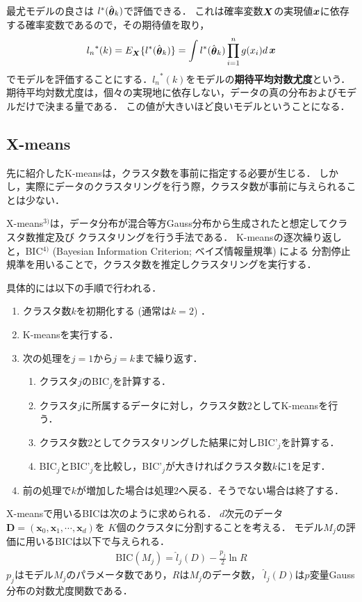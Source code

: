 最尤モデルの良さは $l^*(\hat{\mathop{\bm{\theta}}}_k)$で評価できる．
これは確率変数$\mathop{\bm{X}}$の実現値$\mathop{\bm{x}}$に依存する確率変数であるので，その期待値を取り，
\begin{align*}
  {l_n}^*(k) = E_{\mathop{\bm{X}}}\{l^*(\hat{\mathop{\bm{\theta}}}_k)\} = \int l^*(\hat{\mathop{\bm{\theta}}}_k) \prod^n_{i=1} g(x_i) d\mathop{\bm{x}}
\end{align*}
でモデルを評価することにする．${l_n}^*(k)$をモデルの\textbf{期待平均対数尤度}という．
期待平均対数尤度は，個々の実現地に依存しない，データの真の分布およびモデルだけで決まる量である．
この値が大きいほど良いモデルということになる．



\subsection{X-means}
先に紹介したK-meansは，クラスタ数を事前に指定する必要が生じる．
しかし，実際にデータのクラスタリングを行う際，クラスタ数が事前に与えられることは少ない．

X-means$^{3)}$は，データ分布が混合等方Gauss分布から生成されたと想定してクラスタ数推定及び
クラスタリングを行う手法である．
K-meansの逐次繰り返しと，BIC$^{4)}$ (Bayesian Information Criterion; ベイズ情報量規準) による
分割停止規準を用いることで，クラスタ数を推定しクラスタリングを実行する．

具体的には以下の手順で行われる．
\begin{enumerate}
    \item クラスタ数$k$を初期化する (通常は$k=2$) ．
    \item K-meansを実行する．
    \item 次の処理を$j=1$から$j=k$まで繰り返す．
    \begin{enumerate}
        \item クラスタ$j$のBIC$_j$を計算する．
        \item クラスタ$j$に所属するデータに対し，クラスタ数2としてK-meansを行う．
        \item クラスタ数2としてクラスタリングした結果に対しBIC'$_j$を計算する．
        \item BIC$_j$とBIC'$_j$を比較し，BIC'$_j$が大きければクラスタ数$k$に1を足す．
    \end{enumerate}
    \item 前の処理で$k$が増加した場合は処理2へ戻る．そうでない場合は終了する．
\end{enumerate}

X-meansで用いるBICは次のように求められる．
$d$次元のデータ${\bm D}=({\bm x_0}, {\bm x_1}, \cdots, {\bm x_d})$を
$K$個のクラスタに分割することを考える．
モデル$M_j$の評価に用いるBICは以下で与えられる．
\begin{align}
  \label{eq:bic}
  \mathrm{BIC}(M_j) = \hat{l}_j(D) - \frac{p_j}{2}\ln R
\end{align}
$p_j$はモデル$M_j$のパラメータ数であり，$R$は$M_j$のデータ数，
$\hat{l}_j(D)$は$p$変量Gauss分布の対数尤度関数である．

